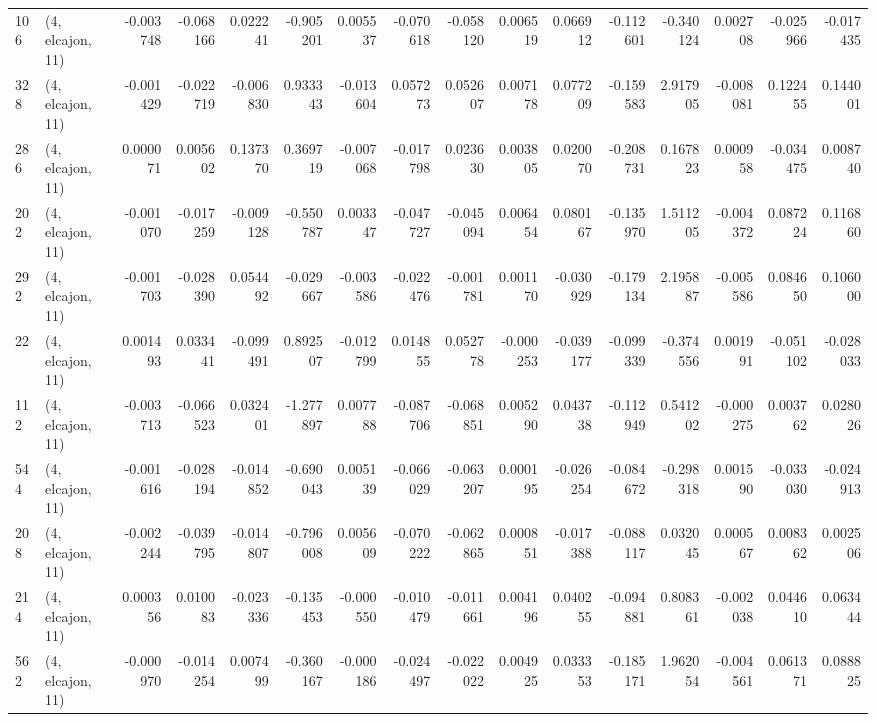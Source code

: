 \begin{tabular}{llrrrrrrrrrrrrrr}
106 &  (4, elcajon, 11) &  -0.003748 & -0.068166 &  0.022241 &   -0.905201 &  0.005537 &  -0.070618 & -0.058120 &  0.006519 &  0.066912 & -0.112601 &   -0.340124 &  0.002708 & -0.025966 & -0.017435 \\
328 &  (4, elcajon, 11) &  -0.001429 & -0.022719 & -0.006830 &    0.933343 & -0.013604 &   0.057273 &  0.052607 &  0.007178 &  0.077209 & -0.159583 &    2.917905 & -0.008081 &  0.122455 &  0.144001 \\
286 &  (4, elcajon, 11) &   0.000071 &  0.005602 &  0.137370 &    0.369719 & -0.007068 &  -0.017798 &  0.023630 &  0.003805 &  0.020070 & -0.208731 &    0.167823 &  0.000958 & -0.034475 &  0.008740 \\
202 &  (4, elcajon, 11) &  -0.001070 & -0.017259 & -0.009128 &   -0.550787 &  0.003347 &  -0.047727 & -0.045094 &  0.006454 &  0.080167 & -0.135970 &    1.511205 & -0.004372 &  0.087224 &  0.116860 \\
292 &  (4, elcajon, 11) &  -0.001703 & -0.028390 &  0.054492 &   -0.029667 & -0.003586 &  -0.022476 & -0.001781 &  0.001170 & -0.030929 & -0.179134 &    2.195887 & -0.005586 &  0.084650 &  0.106000 \\
22  &  (4, elcajon, 11) &   0.001493 &  0.033441 & -0.099491 &    0.892507 & -0.012799 &   0.014855 &  0.052778 & -0.000253 & -0.039177 & -0.099339 &   -0.374556 &  0.001991 & -0.051102 & -0.028033 \\
112 &  (4, elcajon, 11) &  -0.003713 & -0.066523 &  0.032401 &   -1.277897 &  0.007788 &  -0.087706 & -0.068851 &  0.005290 &  0.043738 & -0.112949 &    0.541202 & -0.000275 &  0.003762 &  0.028026 \\
544 &  (4, elcajon, 11) &  -0.001616 & -0.028194 & -0.014852 &   -0.690043 &  0.005139 &  -0.066029 & -0.063207 &  0.000195 & -0.026254 & -0.084672 &   -0.298318 &  0.001590 & -0.033030 & -0.024913 \\
208 &  (4, elcajon, 11) &  -0.002244 & -0.039795 & -0.014807 &   -0.796008 &  0.005609 &  -0.070222 & -0.062865 &  0.000851 & -0.017388 & -0.088117 &    0.032045 &  0.000567 &  0.008362 &  0.002506 \\
214 &  (4, elcajon, 11) &   0.000356 &  0.010083 & -0.023336 &   -0.135453 & -0.000550 &  -0.010479 & -0.011661 &  0.004196 &  0.040255 & -0.094881 &    0.808361 & -0.002038 &  0.044610 &  0.063444 \\
562 &  (4, elcajon, 11) &  -0.000970 & -0.014254 &  0.007499 &   -0.360167 & -0.000186 &  -0.024497 & -0.022022 &  0.004925 &  0.033353 & -0.185171 &    1.962054 & -0.004561 &  0.061371 &  0.088825 \\

\end{tabular}
